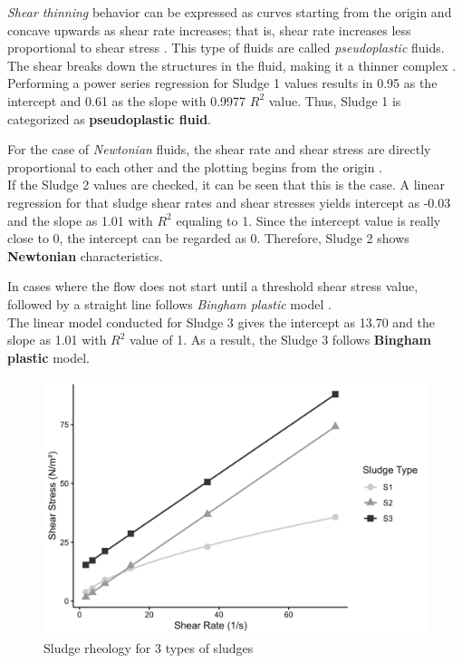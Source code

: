 \documentclass[a4paper]{article}
\begin{document}
\begin{sludgenum}
    \item \textsl{Shear thinning} behavior can be expressed as curves starting from the origin and concave upwards as shear rate increases; that is, shear rate increases less proportional to shear stress \autocite{Rao2014}. This type of fluids are called \textit{pseudoplastic} fluids. The shear breaks down the structures in the fluid, making it a thinner complex \autocite{sanin2011, dick1967}.\\
    Performing a power series regression for Sludge 1 values results in 0.95 as the intercept and 0.61 as the slope with 0.9977 $R^2$ value. Thus, Sludge 1 is categorized as \textbf{pseudoplastic fluid}.
    \item For the case of \textsl{Newtonian} fluids, the shear rate and shear stress are directly proportional to each other and the plotting begins from the origin \autocite{Rao2014}.\\
    If the Sludge 2 values are checked, it can be seen that this is the case. A linear regression for that sludge shear rates and shear stresses yields intercept as -0.03 and the slope as 1.01 with $R^2$ equaling to 1. Since the intercept value is really close to 0, the intercept can be regarded as 0. Therefore, Sludge 2 shows \textbf{Newtonian} characteristics.
    \item In cases where the flow does not start until a threshold shear stress value, followed by a straight line follows \textsl{Bingham plastic} model \autocite{Rao2014}.\\
    The linear model conducted for Sludge 3 gives the intercept as 13.70 and the slope as 1.01 with $R^2$ value of 1. As a result, the Sludge 3 follows \textbf{Bingham plastic} model.
\end{sludgenum}
\begin{figure}[ht]
    \centering
    \includegraphics[scale=1]{homeworks/hw2/sludgeShear.png}
    \caption{Sludge rheology for 3 types of sludges}
    \label{fig:SludgeShear}
\end{figure}
\end{document}
